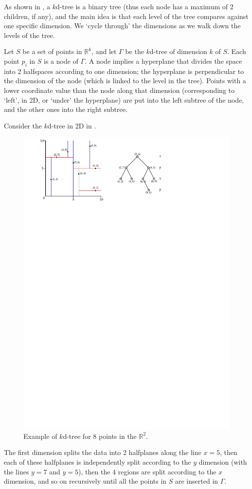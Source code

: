 %

As shown in , a $k$d-tree is a binary tree%
(thus each node has a maximum of 2 children, if any), and the main idea is that each level of the tree compares against one specific dimension.
We `cycle through' the dimensions as we walk down the levels of the tree.

%

Let $S$ be a set of points in $\mathbb{R}^k$, and let $\Gamma$ be the $k$d-tree of dimension $k$ of $S$.
Each point $p_i$ in $S$ is a node of $\Gamma$.
A node implies a hyperplane%
that divides the space into 2 halfspaces according to one dimension; the hyperplane is perpendicular to the dimension of the node (which is linked to the level in the tree).
Points with a lower coordinate value than the node along that dimension (corresponding to `left', in 2D, or `under' the hyperplane) are put into the left subtree of the node, and the other ones into the right subtree.

Consider the $k$d-tree in 2D in .
\begin{figure}[tbp]
  \centering
  \includegraphics[width=0.9\linewidth]{figs/kdtree2}
  \caption{Example of $k$d-tree for 8 points in the $\mathbb{R}^2$.}%
\end{figure}
The first dimension splits the data into 2 halfplanes along the line $x=5$, then each of these halfplanes is independently split according to the $y$ dimension (with the lines $y=7$ and $y=5$), then the 4 regions are split according to the $x$ dimension, and so on recursively until all the points in $S$ are inserted in $\Gamma$.


